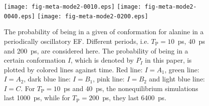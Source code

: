 \documentclass[a4paper,preprint,unsortedaddress,onecolumn]{revtex4-1}
\newcommand{\period}[0]{T_{\textrm{P}}}
\begin{document}
\begin{figure}
  \centering
  \texttt{[image: fig-meta-mode2-0010.eps]}
  \texttt{[image: fig-meta-mode2-0040.eps]}
  \texttt{[image: fig-meta-mode2-0200.eps]}
  \caption{The probability of being in a given of conformation for alanine in a   periodically oscillatory EF. Different periods,
    i.e. $\period =10$~ps, 40~ps and 200~ps, are considered here.  The
    probability of being in a certain conformation $I$, which is
    denoted by $P_I$ in this paper, is plotted by colored lines against
    time. Red line: $I = A_1$,  green line: $I = A_2$,  dark
    blue line: $I = B_1$,  pink line: $I = B_2$ and  light blue
    line: $I = C$. For $\period =10$~ps and 40~ps, the nonequilibrium
    simulations last 1000~ps, while for $\period =200$~ps,
    they last 6400~ps.  }
  \label{fig:tmp9}
\end{figure}
\end{document}
